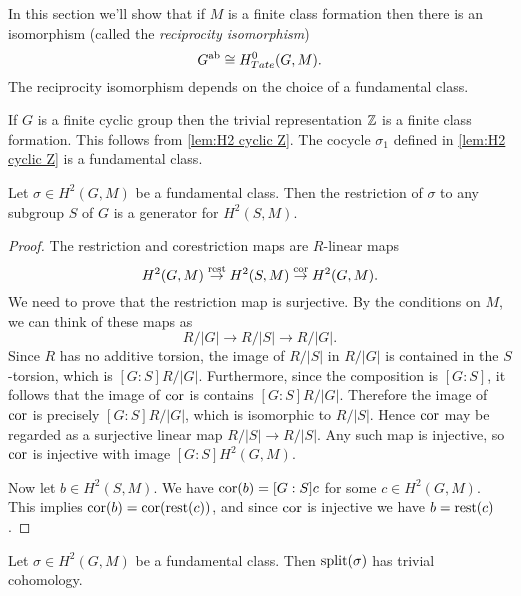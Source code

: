 In this section we'll show that if $M$ is a finite class formation then
there is an isomorphism (called the \emph{reciprocity isomorphism})
\[
	G^{\mathrm{ab}} \cong H^0_{Tate}(G,M).
\]
The reciprocity isomorphism depends on the choice of a fundamental class.

\begin{example}
	If $G$ is a finite cyclic group then the trivial representation ${\mathbb Z}$
	is a finite class formation.
	This follows from \ref{lem:H2 cyclic Z}.
	The cocycle $\sigma_1$ defined in \ref{lem:H2 cyclic Z} is a fundamental class.
\end{example}

\begin{lemma} \label{lem:restriction fundamental class generates}
	Let $\sigma \in H^2(G,M)$ be a fundamental class.
	Then the restriction of $\sigma$ to any subgroup $S$ of $G$
	is a generator for $H^2(S,M)$.
\end{lemma}

\begin{proof}
	The restriction and corestriction maps are $R$-linear maps
	\[
		H^2(G,M) \stackrel{\mathrm{rest}}\to H^2(S,M) \stackrel{\mathrm{cor}}\to H^2(G,M).
	\]
	We need to prove that the restriction map is surjective.
	By the conditions on $M$, we can think of these maps as
	\[
		R / |G| \to R / |S| \to R / |G|.
	\]
	Since $R$ has no additive torsion, the image of $R/|S|$ in $R/|G|$
	is contained in the $S$-torsion, which is $[G:S] R / |G|$.
	Furthermore, since the composition is $[G:S]$,
	it follows that the image of $\mathrm{cor}$ is contains $[G:S] R / |G|$.
	Therefore the image of $\mathrm{cor}$ is precisely $[G:S] R / |G|$, which
	is isomorphic to $R/|S|$. Hence $\mathrm{cor}$ may be regarded as a surjective linear map
	$R/|S| \to R/|S|$. Any such map is injective, so $\mathrm{cor}$ is injective with image
	$[G:S] H^2(G,M)$.

	Now let $b \in H^2(S,M)$. We have $\mathrm{cor}(b) = [G:S]c$ for some $c \in H^2(G,M)$.
	This implies $\mathrm{cor}(b) = \mathrm{cor} (\mathrm{rest}( c))$, and since $\mathrm{cor}$ is injective we have
	$b = \mathrm{rest}(c)$.
\end{proof}

\begin{theorem} \label{thm:splitting module trivial}
	Let $\sigma \in H^2(G,M)$ be a fundamental class.
	Then $\mathrm{split}(\sigma)$ has trivial cohomology.
\end{theorem}

